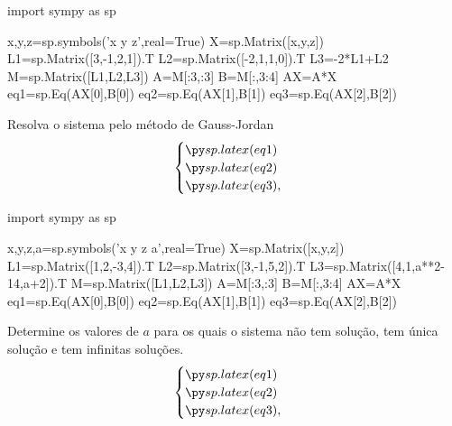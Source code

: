 \begin{frame}[label=sistemas,fragile=singleslide]{}

\begin{pycode}
import sympy as sp

x,y,z=sp.symbols('x y z',real=True)
X=sp.Matrix([x,y,z])
L1=sp.Matrix([3,-1,2,1]).T
L2=sp.Matrix([-2,1,1,0]).T
L3=-2*L1+L2
M=sp.Matrix([L1,L2,L3])
A=M[:3,:3]
B=M[:,3:4]
AX=A*X
eq1=sp.Eq(AX[0],B[0])
eq2=sp.Eq(AX[1],B[1])
eq3=sp.Eq(AX[2],B[2])
\end{pycode}
\begin{exe}
Resolva o sistema pelo método de Gauss-Jordan
\[\begin{cases}
\pyl{eq1}\\
\pyl{eq2}\\
\pyl{eq3},
\end{cases}\]
\end{exe}


\begin{pycode}
import sympy as sp

x,y,z,a=sp.symbols('x y z a',real=True)
X=sp.Matrix([x,y,z])
L1=sp.Matrix([1,2,-3,4]).T
L2=sp.Matrix([3,-1,5,2]).T
L3=sp.Matrix([4,1,a**2-14,a+2]).T
M=sp.Matrix([L1,L2,L3])
A=M[:3,:3]
B=M[:,3:4]
AX=A*X
eq1=sp.Eq(AX[0],B[0])
eq2=sp.Eq(AX[1],B[1])
eq3=sp.Eq(AX[2],B[2])
\end{pycode}
\begin{exe}
Determine os valores de $a$ para os quais o sistema não tem solução, tem única solução e tem infinitas soluções.
\[\begin{cases}
\pyl{eq1}\\
\pyl{eq2}\\
\pyl{eq3},
\end{cases}\]
\end{exe}
\end{frame}


